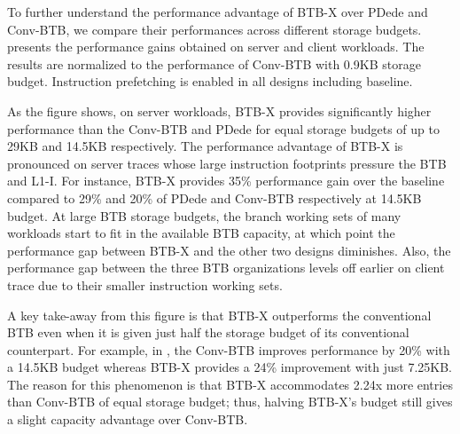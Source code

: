 To further understand the performance advantage of BTB-X over PDede and Conv-BTB, we compare their performances across different storage budgets.  presents the performance gains obtained on server and client workloads. The results are normalized to the performance of Conv-BTB with 0.9KB storage budget. Instruction prefetching is enabled in all designs including baseline.

As the figure shows, on server workloads, BTB-X provides significantly higher performance than the Conv-BTB and PDede for equal storage budgets of up to 29KB and 14.5KB respectively. The performance advantage of BTB-X is pronounced on server traces whose large instruction footprints pressure the BTB and L1-I. For instance, BTB-X provides 35\% performance gain over the baseline compared to 29\% and 20\% of PDede and Conv-BTB respectively at 14.5KB budget. At large BTB storage budgets, the branch working sets of many workloads start to fit in the available BTB capacity, at which point the performance gap between BTB-X and the other two designs diminishes. Also, the performance gap between the three BTB organizations levels off earlier on client trace due to their smaller instruction working sets.

A key take-away from this figure is that BTB-X outperforms the conventional BTB even when it is given just half the storage budget of its conventional counterpart. For example, in , the Conv-BTB improves performance by 20\% with a 14.5KB budget whereas BTB-X provides a 24\% improvement with just 7.25KB. The reason for this phenomenon is that BTB-X accommodates 2.24x more entries than Conv-BTB of equal storage budget; thus, halving BTB-X's budget still gives a slight capacity advantage over Conv-BTB.


